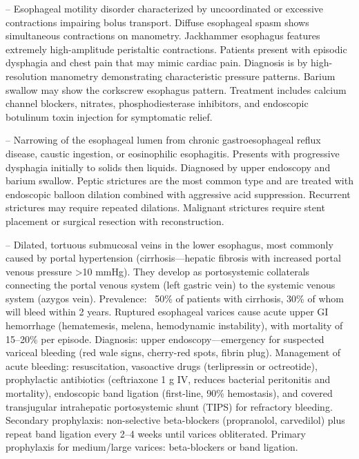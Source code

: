 -- Esophageal motility disorder characterized by uncoordinated or excessive contractions impairing bolus transport. Diffuse esophageal spasm shows simultaneous contractions on manometry. Jackhammer esophagus features extremely high-amplitude peristaltic contractions. Patients present with episodic dysphagia and chest pain that may mimic cardiac pain. Diagnosis is by high-resolution manometry demonstrating characteristic pressure patterns. Barium swallow may show the corkscrew esophagus pattern. Treatment includes calcium channel blockers, nitrates, phosphodiesterase inhibitors, and endoscopic botulinum toxin injection for symptomatic relief.

-- Narrowing of the esophageal lumen from chronic gastroesophageal reflux disease, caustic ingestion, or eosinophilic esophagitis. Presents with progressive dysphagia initially to solids then liquids. Diagnosed by upper endoscopy and barium swallow. Peptic strictures are the most common type and are treated with endoscopic balloon dilation combined with aggressive acid suppression. Recurrent strictures may require repeated dilations. Malignant strictures require stent placement or surgical resection with reconstruction.

-- Dilated, tortuous submucosal veins in the lower esophagus, most commonly caused by portal hypertension (cirrhosis—hepatic fibrosis with increased portal venous pressure >10 mmHg). They develop as portosystemic collaterals connecting the portal venous system (left gastric vein) to the systemic venous system (azygos vein). Prevalence: ~50\% of patients with cirrhosis, 30\% of whom will bleed within 2 years. Ruptured esophageal varices cause acute upper GI hemorrhage (hematemesis, melena, hemodynamic instability), with mortality of 15--20\% per episode. Diagnosis: upper endoscopy—emergency for suspected variceal bleeding (red wale signs, cherry-red spots, fibrin plug). Management of acute bleeding: resuscitation, vasoactive drugs (terlipressin or octreotide), prophylactic antibiotics (ceftriaxone 1 g IV, reduces bacterial peritonitis and mortality), endoscopic band ligation (first-line, 90\% hemostasis), and covered transjugular intrahepatic portosystemic shunt (TIPS) for refractory bleeding. Secondary prophylaxis: non-selective beta-blockers (propranolol, carvedilol) plus repeat band ligation every 2--4 weeks until varices obliterated. Primary prophylaxis for medium/large varices: beta-blockers or band ligation.


